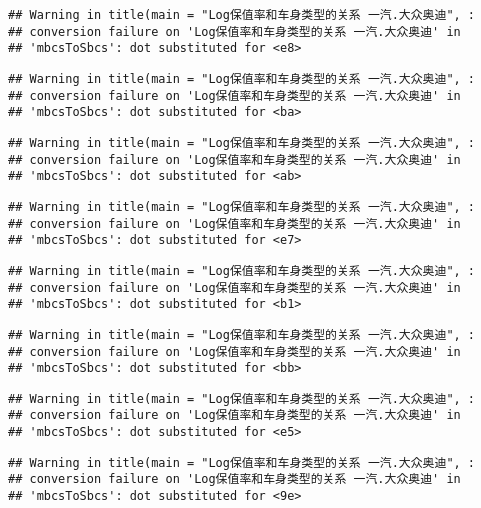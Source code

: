 \documentclass[]{article}
\begin{document}
\begin{verbatim}
## Warning in title(main = "Log保值率和车身类型的关系 一汽.大众奥迪", :
## conversion failure on 'Log保值率和车身类型的关系 一汽.大众奥迪' in
## 'mbcsToSbcs': dot substituted for <e8>
\end{verbatim}

\begin{verbatim}
## Warning in title(main = "Log保值率和车身类型的关系 一汽.大众奥迪", :
## conversion failure on 'Log保值率和车身类型的关系 一汽.大众奥迪' in
## 'mbcsToSbcs': dot substituted for <ba>
\end{verbatim}

\begin{verbatim}
## Warning in title(main = "Log保值率和车身类型的关系 一汽.大众奥迪", :
## conversion failure on 'Log保值率和车身类型的关系 一汽.大众奥迪' in
## 'mbcsToSbcs': dot substituted for <ab>
\end{verbatim}

\begin{verbatim}
## Warning in title(main = "Log保值率和车身类型的关系 一汽.大众奥迪", :
## conversion failure on 'Log保值率和车身类型的关系 一汽.大众奥迪' in
## 'mbcsToSbcs': dot substituted for <e7>
\end{verbatim}

\begin{verbatim}
## Warning in title(main = "Log保值率和车身类型的关系 一汽.大众奥迪", :
## conversion failure on 'Log保值率和车身类型的关系 一汽.大众奥迪' in
## 'mbcsToSbcs': dot substituted for <b1>
\end{verbatim}

\begin{verbatim}
## Warning in title(main = "Log保值率和车身类型的关系 一汽.大众奥迪", :
## conversion failure on 'Log保值率和车身类型的关系 一汽.大众奥迪' in
## 'mbcsToSbcs': dot substituted for <bb>
\end{verbatim}

\begin{verbatim}
## Warning in title(main = "Log保值率和车身类型的关系 一汽.大众奥迪", :
## conversion failure on 'Log保值率和车身类型的关系 一汽.大众奥迪' in
## 'mbcsToSbcs': dot substituted for <e5>
\end{verbatim}

\begin{verbatim}
## Warning in title(main = "Log保值率和车身类型的关系 一汽.大众奥迪", :
## conversion failure on 'Log保值率和车身类型的关系 一汽.大众奥迪' in
## 'mbcsToSbcs': dot substituted for <9e>
\end{verbatim}
\end{document}
